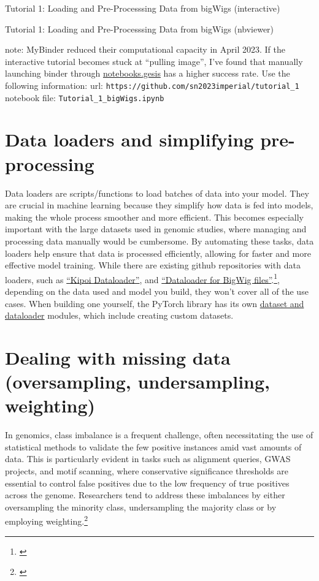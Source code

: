 \documentclass[
]{book}
\begin{document}
Tutorial 1: Loading and Pre-Processsing Data from bigWigs (interactive)

Tutorial 1: Loading and Pre-Processsing Data from bigWigs (nbviewer)

note: MyBinder reduced their computational capacity in April 2023. If the interactive tutorial becomes stuck at ``pulling image'', I've found that manually launching binder through \href{https://notebooks.gesis.org/binder/}{notebooks.gesis} has a higher success rate. Use the following information:
url: \texttt{https://github.com/sn2023imperial/tutorial\_1}
notebook file: \texttt{Tutorial\_1\_bigWigs.ipynb}

\section{Data loaders and simplifying pre-processing}\label{data-loaders-and-simplifying-pre-processing}

Data loaders are scripts/functions to load batches of data into your model. They are crucial in machine learning because they simplify how data is fed into models, making the whole process smoother and more efficient. This becomes especially important with the large datasets used in genomic studies, where managing and processing data manually would be cumbersome. By automating these tasks, data loaders help ensure that data is processed efficiently, allowing for faster and more effective model training. While there are existing github repositories with data loaders, such as \href{https://kipoi.org/kipoiseq/dataloaders/}{``Kipoi Dataloader''}, and \href{https://github.com/pfizer-opensource/bigwig-loader/blob/main/README.md}{``Dataloader for BigWig files''}.\footnote{\citet{retel_fast_2024}}, depending on the data used and model you build, they won't cover all of the use cases. When building one yourself, the PyTorch library has its own \href{https://pytorch.org/tutorials/beginner/basics/data_tutorial.html}{dataset and dataloader} modules, which include creating custom datasets.

\section{Dealing with missing data (oversampling, undersampling, weighting)}\label{dealing-with-missing-data-oversampling-undersampling-weighting}

In genomics, class imbalance is a frequent challenge, often necessitating the use of statistical methods to validate the few positive instances amid vast amounts of data. This is particularly evident in tasks such as alignment queries, GWAS projects, and motif scanning, where conservative significance thresholds are essential to control false positives due to the low frequency of true positives across the genome. Researchers tend to address these imbalances by either oversampling the minority class, undersampling the majority class or by employing weighting.\footnote{\citet{whalen2022}}
\end{document}
